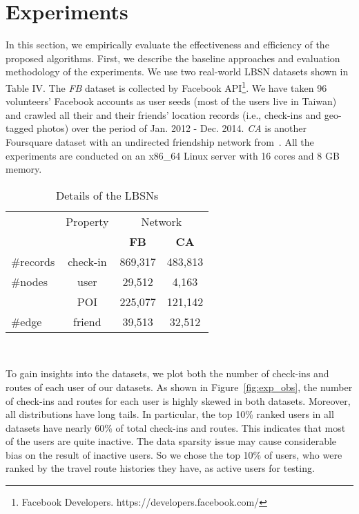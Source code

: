  \section{Experiments}
 In this section, we empirically evaluate the effectiveness and efficiency of the proposed algorithms. First, we describe the baseline approaches and evaluation methodology of the experiments. We use two real-world LBSN datasets shown in Table IV. The \textit{FB} dataset is collected by Facebook API\footnote{Facebook Developers. https://developers.facebook.com/}. We have taken 96 volunteers' Facebook accounts as user seeds (most of the users live in Taiwan) and crawled all their and their friends' location records (i.e., check-ins and geo-tagged photos) over the period of Jan. 2012 - Dec. 2014. \textit{CA} is another Foursquare dataset with an undirected friendship network from~\cite{gao2012exploring}. All the experiments are conducted on an x86\_64 Linux server with 16 cores and 8 GB memory. %

\begin{table}[h]
\begin{center}
\caption{Details of the LBSNs}
\footnotesize{
\begin{tabular}{|l|c|c|c|}
  \hline
   & Property & \multicolumn{2}{|c|}{Network} \\ \cline{3-4}
   & & \textbf{FB} & \textbf{CA}\\
  \hline
   \#records & check-in & 869,317 & 483,813\\
  \hline
   \#nodes & user & 29,512 & 4,163\\
   & POI & 225,077 & 121,142\\
  \hline
   \#edge & friend & 39,513 & 32,512\\
  \hline
\end{tabular}}\\
\end{center}
\label{table:data.des}
\vspace{-1.3mm}
\end{table}

To gain insights into the datasets, we plot both the number of check-ins and routes of each user of our datasets. As shown in Figure~\ref{fig:exp_obs}, the number of check-ins and routes for each user is highly skewed in both datasets. Moreover, all distributions have long tails. In particular, the top 10\% ranked users in all datasets have nearly 60\% of total check-ins and routes. This indicates that most of the users are quite inactive. The data sparsity issue may cause considerable bias on the result of inactive users. So we chose the top 10\% of users, who were ranked by the travel route histories they have, as active users for testing. 


